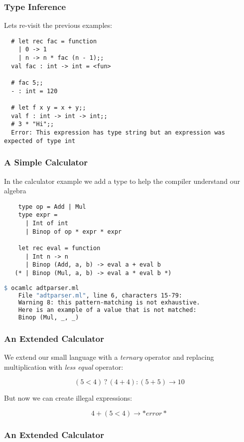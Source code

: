 \documentclass[xcolor=svgnames]{beamer}
\renewcommand{\_}{\mathunderscore}
\begin{document}
\begin{frame}[fragile]
  \frametitle{Type Inference}
  Lets re-visit the previous examples:
  \begin{lstlisting}
  # let rec fac = function
    | 0 -> 1
    | n -> n * fac (n - 1);;
  val fac : int -> int = <fun>

  # fac 5;;
  - : int = 120

  # let f x y = x + y;;
  val f : int -> int -> int;;
  # 3 * "Hi";;
  Error: This expression has type string but an expression was expected of type int
  \end{lstlisting}

\end{frame}

\begin{frame}[fragile]
  \frametitle{A Simple Calculator}
  In the calculator example we add a type to help the compiler
  understand our algebra
  \begin{lstlisting}
    type op = Add | Mul
    type expr =
      | Int of int
      | Binop of op * expr * expr

    let rec eval = function
      | Int n -> n
      | Binop (Add, a, b) -> eval a + eval b
   (* | Binop (Mul, a, b) -> eval a * eval b *)

  \end{lstlisting}
  \pause
  \begin{lstlisting}[language=make,frame=none,numbers=none]
    $ ocamlc adtparser.ml
    File "adtparser.ml", line 6, characters 15-79:
    Warning 8: this pattern-matching is not exhaustive.
    Here is an example of a value that is not matched:
    Binop (Mul, _, _)
  \end{lstlisting}

\end{frame}

\begin{frame}[fragile]
  \frametitle{An Extended Calculator}
  We extend our small language with a \textit{ternary} operator and
  replacing multiplication with  \textit{less equal} operator:

  \[(5 < 4) \mathbin? (4 + 4) : (5 + 5) \to 10\]

  \pause
  But now we can create illegal expressions:

  \[4 + (5 < 4) \to *error*\]

\end{frame}

\begin{frame}[fragile]
  \frametitle{An Extended Calculator}
  
\end{frame}
\end{document}
